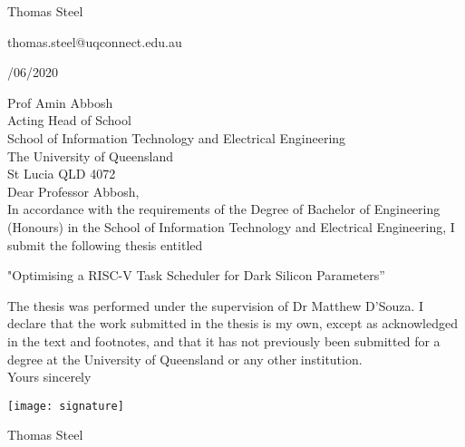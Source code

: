 \begin{flushright}
Thomas Steel\\

\vspace{5mm}

thomas.steel@uqconnect.edu.au \\
\end{flushright}

\vspace{20mm}

/06/2020

\vspace{5mm}

\noindent Prof Amin Abbosh\\
Acting Head of School\\
School of Information Technology and Electrical Engineering\\
The University of Queensland\\
St Lucia  QLD  4072\\

\noindent Dear Professor Abbosh,\\

\noindent In accordance with the requirements of the Degree of Bachelor of Engineering (Honours) in the School of Information Technology and Electrical Engineering, I submit the following thesis entitled

\begin{center} "Optimising a RISC-V Task Scheduler for Dark Silicon Parameters”\\ \end{center}


\noindent The thesis was performed under the supervision of Dr Matthew D’Souza. I declare that the work submitted in the thesis is my own, except as acknowledged in the text and footnotes, and that it has not previously been submitted for a degree at the University of Queensland or any other institution.\\

\noindent Yours sincerely

\vspace{5mm}

\texttt{[image: signature]}

\vspace{5mm}

\noindent Thomas Steel



\nocite{*}
